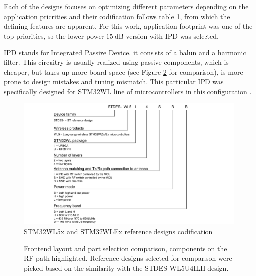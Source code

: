 Each of the designs focuses on optimizing different parameters depending on the application priorities and their codification follows table \ref{fig:reference-design-codification}, from which the defining features are apparent. For this work, application footprint was one of the top priorities, so the lower-power $15~\mathrm{dB}$ version with IPD was selected.

IPD stands for Integrated Passive Device, it consists of a balun and a harmonic filter. This circuitry is usually realized using passive components, which is cheaper, but takes up more board space (see Figure \ref{fig:frontend-comparison} for comparison), is more prone to design mistakes and tuning mismatch. This particular IPD was specifically designed for STM32WL line of microcontrollers in this configuration \cite{stmicroelectronics_balfhb-wl-05d3_2024}.

\begin{figure}
    \includegraphics[width=\textwidth]{fig/STDES-xxxxxxx.png}
    \caption{\label{fig:reference-design-codification} STM32WL5x and STM32WLEx reference designs codification}
\end{figure}

\begin{figure}
    \centering
    \hfill
    \hfill
    \caption{\label{fig:frontend-comparison} Frontend layout and part selection comparison, components on the RF path highlighted. Reference designs selected for comparison were picked based on the similarity with the STDES-WL5U4ILH design.}
\end{figure}

